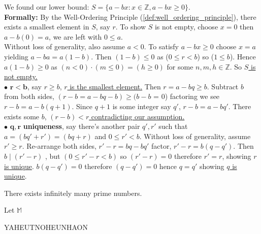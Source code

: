 \begin{Proof} 
    \noindent
    We found our lower bound: \Large{$S=\{a-bx:x\in\mathbb{Z}, a-bx\geq0\}$.}\\

    \normalsize
    \noindent
    \textbf{Formally:} By the Well-Ordering Principle (\ref{def:well_ordering_principle}), there exists a smallest element in $S$, say $r$.
    To show $S$ is not empty, choose $x=0$ then $a-b(0)=a$, we are left with $0\leq a$.\\

    \noindent
    Without loss of generality, also assume $a<0$. To satisfy $a-bx\geq0$ choose $x=a$ yielding
    $a-ba=a(1-b)$. Then $(1-b)\leq0$ as ($0\leq r <b$) so ($1\leq b$). Hence
    $a(1-b)\geq0$ as $(n<0)\cdot (m\leq0)=(h\geq0)$ for some $n,m,h\in\mathbb{Z}$. So \underline{$S$ is not empty.}\\

    \noindent
    $\bullet$ $\mathbf{r<b}$, say $r\geq b$, \underline{$r$ is the smallest element.} Then $r=a-bq\geq b$. Subtract $b$ from both sides,
    $(r-b=a-bq-b)\geq (b-b$ = 0) factoring we see $r-b=a-b(q+1)$. Since
    $q+1$ is some integer say $q'$, $r-b=a-bq'$. There exists some $b$, \underline{$(r-b)<r$ contradicting our assumption.}\\

        \noindent
    $\bullet$ $\mathbf{q,r}$ \textbf{uniqueness}, say there's another pair $q',r'$ such that
    $a=(bq'+r')=(bq+r)$ and $0\leq r'<b$. Without loss of generality, assume $r'\geq r$.
        Re-arrange both sides, $r'-r=bq-bq'$ factor, $r'-r=b(q-q')$. Then $b\mid (r'-r)$
        , but $(0\leq r'-r<b)$ so $(r'-r)=0$ therefore $r'=r$, showing \underline{$r$ is unique}.
    $b(q-q')=0$ therefore $(q-q')=0$ hence $q=q'$ showing \underline{$q$ is unique}.
\end{Proof}

\newpage

\begin{theo}

    \label{theo:euclids_theorem}
    
        There exists infinitely many prime numbers.
\end{theo}

\begin{Proof}

    Let $\mathbb{M}$
\end{Proof}

YAHEUTNOHEUNHAON